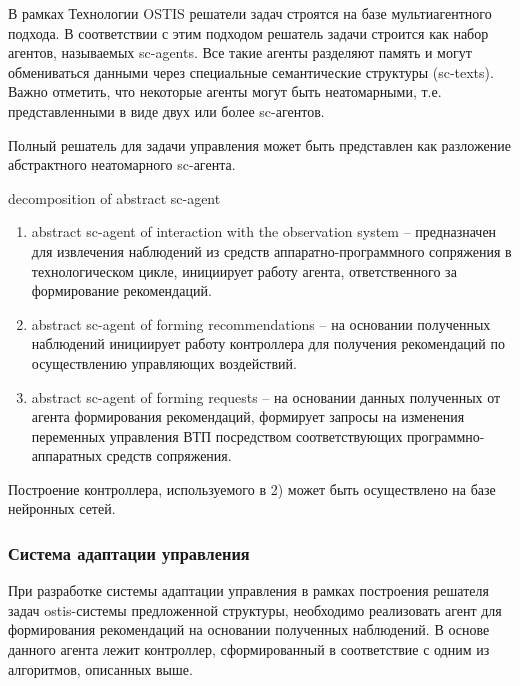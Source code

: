 В рамках Технологии OSTIS решатели задач строятся на базе мультиагентного подхода. В соответствии с этим подходом решатель задачи строится как набор агентов, называемых sc-agents. Все такие агенты разделяют память и могут обмениваться данными через специальные семантические структуры (sc-texts). Важно отметить, что некоторые агенты могут быть неатомарными, т.е. представленными в виде двух или более sc-агентов.

Полный решатель для задачи управления может быть представлен как разложение абстрактного неатомарного sc-агента.


\begin{SCn}
\begin{scnrelfromset}{decomposition of abstract sc-agent}
\end{scnrelfromset}
\end{SCn}

\begin{enumerate}
    \item abstract sc-agent of interaction with the observation system – предназначен для извлечения наблюдений из средств аппаратно-программного сопряжения в технологическом цикле, инициирует работу агента, ответственного за формирование рекомендаций.
    \item abstract sc-agent of forming recommendations – на основании полученных наблюдений инициирует работу контроллера для получения рекомендаций по осуществлению управляющих воздействий.
    \item abstract sc-agent of forming requests – на основании данных полученных от агента формирования рекомендаций, формирует запросы на  изменения переменных управления ВТП посредством соответствующих программно-аппаратных средств сопряжения.

\end{enumerate}

Построение контроллера, используемого в 2) может быть осуществлено на базе нейронных сетей.



\subsubsection{Система адаптации управления}

При разработке  системы адаптации управления в рамках построения решателя задач ostis-системы предложенной структуры, необходимо реализовать агент для формирования рекомендаций на основании полученных наблюдений. В основе данного агента лежит контроллер, сформированный в соответствие с одним из алгоритмов, описанных выше.



